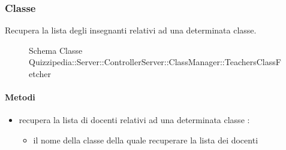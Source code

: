 \subsubsection{Classe }
Recupera la lista degli insegnanti relativi ad una determinata classe.
\begin{figure}[H]
\centering
\noindent{}
\caption[Schema Classe TeachersClassFetcher]{Schema Classe Quizzipedia::Server::ControllerServer::ClassManager::TeachersClassFetcher}
\end{figure}
\paragraph{Metodi}
\begin{itemize}
\item {}
\newline
recupera la lista di docenti relativi ad una determinata classe
\newline
{} :
\begin{itemize}
\item {}
\newline
il nome della classe della quale recuperare la lista dei docenti
\end{itemize}
\end{itemize}
